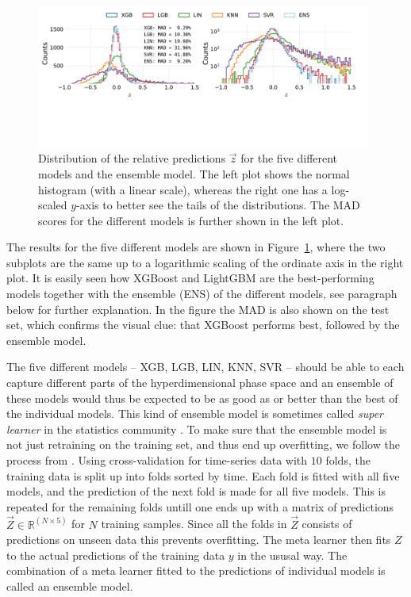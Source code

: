 \begin{figure}[ht!]
  \centerfloat
  \includegraphics[draft=false, width=0.98\textwidth, trim=10 130 40 10, clip]{figures/housing/Ejerlejlighed_v19_cut_all_Ncols_all_all_models.pdf}
  \caption[Performance Comparison of Multiple Models]
          {Distribution of the relative predictions $\vec{z}$ for the five different models and the ensemble model. The left plot shows the normal histogram (with a linear scale), whereas the right one has a log-scaled $y$-axis to better see the tails of the distributions. The MAD scores for the different models is further shown in the left plot.} 
  \label{fig:h:multiple_models}
\end{figure}

The results for the five different models are shown in Figure~\ref{fig:h:multiple_models}, where the two subplots are the same up to a logarithmic scaling of the ordinate axis in the right plot. It is easily seen how XGBoost and LightGBM are the best-performing models together with the ensemble (ENS) of the different models, see paragraph below for further explanation. In the figure the MAD is also shown on the test set, which confirms the visual clue: that XGBoost performs best, followed by the ensemble model.


The five different models -- XGB, LGB, LIN, KNN, SVR -- should be able to each capture different parts of the hyperdimensional phase space and an ensemble of these models would thus be expected to be as good as or better than the best of the individual models. This kind of ensemble model is sometimes called \emph{super learner} in the statistics community \autocite{polleySuperLearnerPrediction2010,vanSuperLearner2007}. To make sure that the ensemble model is not just retraining on the training set, and thus end up overfitting, we follow the process from \citet{polleySuperLearnerPrediction2010}. Using cross-validation for time-series data with $10$ folds, the training data is split up into folds sorted by time. Each fold is fitted with all five models, and the prediction of the next fold is made for all five models. This is repeated for the remaining folds untill one ends up with a matrix of predictions $\vec{Z} \in \mathbb{R}^{(N \times 5)}$ for $N$ training samples. Since all the folds in $\vec{Z}$ consists of predictions on unseen data this prevents overfitting. The meta learner then fits $Z$ to the actual predictions of the training data $y$ in the ususal way. The combination of a meta learner fitted to the predictions of individual models is called an ensemble model.


